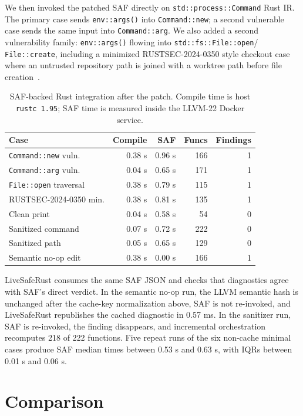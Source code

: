 \documentclass[sigconf,nonacm]{acmart}
\begin{document}
We then invoked the patched SAF directly on \texttt{std::process::Command}
Rust IR. The primary case sends \texttt{env::args()} into
\texttt{Command::new}; a second vulnerable case sends the same input into
\texttt{Command::arg}. We also added a second vulnerability family:
\texttt{env::args()} flowing into \texttt{std::fs::File::open}/
\texttt{File::create}, including a minimized RUSTSEC-2024-0350 style checkout
case where an untrusted repository path is joined with a worktree path before
file creation~\cite{rustsec-gixfs}.

\begin{table}[h]
\caption{SAF-backed Rust integration after the patch. Compile time is host
\texttt{rustc 1.95}; SAF time is measured inside the LLVM-22 Docker service.}
\label{tab:saf-backed}
\begin{tabular}{lrrrr}
\toprule
Case & Compile & SAF & Funcs & Findings \\
\midrule
\texttt{Command::new} vuln. & 0.38 s & 0.96 s & 166 & 1 \\
\texttt{Command::arg} vuln. & 0.04 s & 0.65 s & 171 & 1 \\
\texttt{File::open} traversal & 0.38 s & 0.79 s & 115 & 1 \\
RUSTSEC-2024-0350 min. & 0.38 s & 0.81 s & 135 & 1 \\
Clean print & 0.04 s & 0.58 s & 54 & 0 \\
Sanitized command & 0.07 s & 0.72 s & 222 & 0 \\
Sanitized path & 0.05 s & 0.65 s & 129 & 0 \\
Semantic no-op edit & 0.38 s & 0.00 s & 166 & 1 \\
\bottomrule
\end{tabular}
\end{table}

LiveSafeRust consumes the same SAF JSON and checks that diagnostics agree with
SAF's direct verdict. In the semantic no-op run, the LLVM semantic hash is
unchanged after the cache-key normalization above, SAF is not re-invoked, and LiveSafeRust republishes the cached
diagnostic in 0.57 ms. In the sanitizer run, SAF is re-invoked, the finding
disappears, and incremental orchestration recomputes 218 of 222 functions. Five
repeat runs of the six non-cache minimal cases produce SAF median times between
0.53 s and 0.63 s, with IQRs between 0.01 s and 0.06 s.

\section{Comparison}
\end{document}
